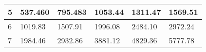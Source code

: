 \begin{table}[h]
\begin{tabular}{|l|l|l|l|l|l|}
5                                                      & 537.460                              & 795.483                               & 1053.44                               & 1311.47                               & 1569.51                               \\ \hline
6                                                                   & 1019.83                              & 1507.91                               & 1996.08                               & 2484.10                               & 2972.24                               \\ \hline
7                                                                   & 1984.46                              & 2932.86                               & 3881.12                               & 4829.36                               & 5777.78                               \\ \hline
\end{tabular}
\end{table}


